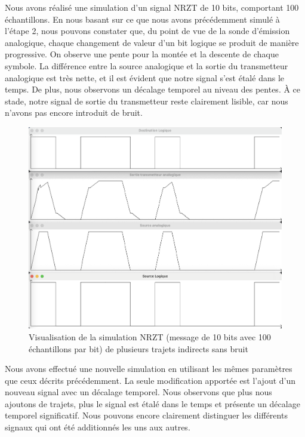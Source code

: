 Nous avons réalisé une simulation d'un signal NRZT de 10 bits, comportant 100 échantillons. En nous basant sur ce que nous avons précédemment simulé à l'étape 2, nous pouvons constater que, du point de vue de la sonde d'émission analogique, chaque changement de valeur d'un bit logique se produit de manière progressive. On observe une pente pour la montée et la descente de chaque symbole. La différence entre la source analogique et la sortie du transmetteur analogique est très nette, et il est évident que notre signal s'est étalé dans le temps. De plus, nous observons un décalage temporel au niveau des pentes. À ce stade, notre signal de sortie du transmetteur reste clairement lisible, car nous n'avons pas encore introduit de bruit.

\begin{figure}[H]
    \centering
    \includegraphics[width=\textwidth]{img/etape4a_ti_multiples.png}
    \caption{Visualisation de la simulation NRZT (message de 10 bits avec 100 échantillons par bit) de plusieurs trajets indirects sans bruit}
    \label{fig:etape4a_ti_multiples}
\end{figure}

Nous avons effectué une nouvelle simulation en utilisant les mêmes paramètres que ceux décrits précédemment. La seule modification apportée est l'ajout d'un nouveau signal avec un décalage temporel. Nous observons que plus nous ajoutons de trajets, plus le signal est étalé dans le temps et présente un décalage temporel significatif. Nous pouvons encore clairement distinguer les différents signaux qui ont été additionnés les uns aux autres.

